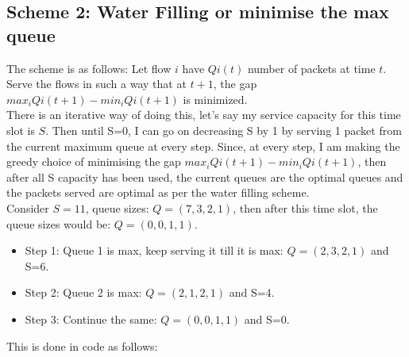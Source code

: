 \documentclass[11pt, a4paper]{article}
\begin{document}
\subsection{Scheme 2: Water Filling or minimise the max queue}
The scheme is as follows: Let flow $i$ have $Qi(t)$ number of packets at time $t$. Serve the flows in such a way that at $t+1$, the gap $max_i Qi(t+1)-min_i Qi(t+1)$ is minimized. \\There is an iterative way of doing this, let's say my service capacity for this time slot is $S$. Then until S=0, I can go on decreasing S by 1 by serving 1 packet from the current maximum queue at every step. Since, at every step, I am making the greedy choice of minimising the gap $max_i Qi(t+1)-min_i Qi(t+1)$, then after all S capacity has been used, the current queues are the optimal queues and the packets served are optimal as per the water filling scheme.\\

Consider $S=11$, queue sizes: $Q = (7,3,2,1)$, then after this time slot, the queue sizes would be: $Q = (0,0,1,1)$.

\begin{itemize} 
\item Step 1: Queue 1 is max, keep serving it till it is max: $Q=(2,3,2,1)$ and S=6.
\item Step 2: Queue 2 is max:  $Q=(2,1,2,1)$ and S=4.
\item Step 3: Continue the same: $Q = (0,0,1,1)$ and S=0.
\end{itemize}
This is done in code as follows:
\end{document}

